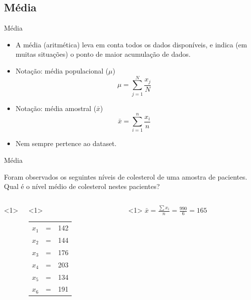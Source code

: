 \documentclass{beamer}
\begin{document}
\subsection{Média}
\begin{frame}{Média}
  \begin{itemize}
  \item A média (aritmética) leva em conta todos os dados disponíveis,
    e indica (em muitas situações) o ponto de maior acumulação de
    dados.
  \item Notação: média populacional ($\mu$)
$$\mu = \sum_{j=1}^N \frac{ x_j}{N}$$
  \item Notação: média amostral ($\bar{x}$)
$$ \bar{x} = \sum_{i=1}^n\frac{ x_i}{n}$$
  \item Nem sempre pertence ao dataset.

  \end{itemize}
\end{frame}

\begin{frame}{Média}
  \begin{example}
    Foram observados os seguintes níveis de colesterol de uma amostra
    de pacientes. Qual é o nível médio de colesterol nestes pacientes?

    \begin{columns}<1>
      \begin{column}{5cm}<1>
        \begin{tabular}{ccc}
          $x_1$ &=&142\\
          $x_2$ &=&144\\
          $x_3$ &=&176\\
          $x_4$ &=&203\\
          $x_5$ &=&134\\
          $x_6$ &=&191\\
        \end{tabular}
      \end{column}
      \begin{column}{5cm}<1>
        $\bar{x} = \frac{\sum x_i}{n} = \frac{990}{6} = 165$
      \end{column}
    \end{columns}
  \end{example}
\end{frame}
\end{document}

